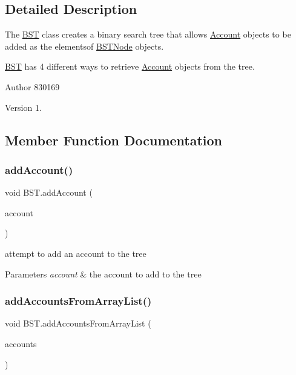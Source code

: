 \subsection{Detailed Description}
The \hyperlink{class_b_s_t}{B\+ST} class creates a binary search tree that allows \hyperlink{class_account}{Account} objects to be added as the elementsof \hyperlink{class_b_s_t_node}{B\+S\+T\+Node} objects. 

\hyperlink{class_b_s_t}{B\+ST} has 4 different ways to retrieve \hyperlink{class_account}{Account} objects from the tree.

\begin{DoxyAuthor}{Author}
830169 
\end{DoxyAuthor}
\begin{DoxyVersion}{Version}
1. 
\end{DoxyVersion}


\subsection{Member Function Documentation}
\mbox{\label{class_b_s_t_a618399aa893cac01fd09ee30329002da}} 
\subsubsection{\texorpdfstring{add\+Account()}{addAccount()}}
{\footnotesize\ttfamily void B\+S\+T.\+add\+Account (\begin{DoxyParamCaption}\item[{\hyperlink{class_account}{Account}}]{account }\end{DoxyParamCaption})}



attempt to add an account to the tree 


\begin{DoxyParams}{Parameters}
{\em account} & the account to add to the tree \\
\hline
\end{DoxyParams}
\mbox{\label{class_b_s_t_a9bc75db08a0e8fe2bd80f3c5c7c59205}} 
\subsubsection{\texorpdfstring{add\+Accounts\+From\+Array\+List()}{addAccountsFromArrayList()}}
{\footnotesize\ttfamily void B\+S\+T.\+add\+Accounts\+From\+Array\+List (\begin{DoxyParamCaption}\item[{Array\+List$<$ \hyperlink{class_account}{Account} $>$}]{accounts }\end{DoxyParamCaption})}



